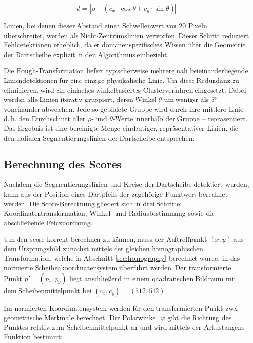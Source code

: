 \begin{equation}
    d = \left| \rho - \left( c_x \cdot \cos\theta + c_y \cdot \sin\theta \right) \right|
\end{equation}
 
Linien, bei denen dieser Abstand einen Schwellenwert von 20 Pixeln überschreitet, werden als Nicht-Zentrumslinien verworfen. Dieser Schritt reduziert Fehldetektionen erheblich, da er domänenspezifisches Wissen über die Geometrie der Dartscheibe explizit in den Algorithmus einbezieht.
 
Die Hough-Transformation liefert typischerweise mehrere nah beieinanderliegende Liniendetektionen für eine einzige physikalische Linie. Um diese Redundanz zu eliminieren, wird ein einfaches winkelbasiertes Clusterverfahren eingesetzt. Dabei werden alle Linien iterativ gruppiert, deren Winkel $\theta$ um weniger als $5$° voneinander abweichen. Jede so gebildete Gruppe wird durch ihre mittlere Linie -- d.\,h. den Durchschnitt aller $\rho$- und $\theta$-Werte innerhalb der Gruppe -- repräsentiert. Das Ergebnis ist eine bereinigte Menge eindeutiger, repräsentativer Linien, die den radialen Segmentierungslinien der Dartscheibe entsprechen.

\subsection{Berechnung des Scores}

Nachdem die Segmentierungslinien und Kreise der Dartscheibe detektiert wurden, kann aus der Position eines Dartpfeils der zugehörige Punktwert berechnet werden. Die Score-Berechnung gliedert sich in drei Schritte: Koordinatentransformation, Winkel- und Radiusbestimmung sowie die abschließende Feldzuordnung.

Um den score korrekt berechnen zu können, muss der Auftreffpunkt $(x, y)$ aus dem Ursprungsbild zunächst mittels der gleichen homographischen Transformation, welche in Abschnitt \ref{sec:homography} berechnet wurde, in das normierte Scheibenkoordinatensystem überführt werden. Der transformierte Punkt $p' = (p_x, p_y)$ liegt anschließend in einem quadratischen Bildraum mit dem Scheibenmittelpunkt bei $(c_x, c_y) = (512, 512)$.

Im normierten Koordinatensystem werden für den transformierten Punkt zwei geometrische Merkmale berechnet. Der Polarwinkel~$\varphi$ gibt die Richtung des Punktes relativ zum Scheibenmittelpunkt an und wird mittels der Arkustangens-Funktion bestimmt:

